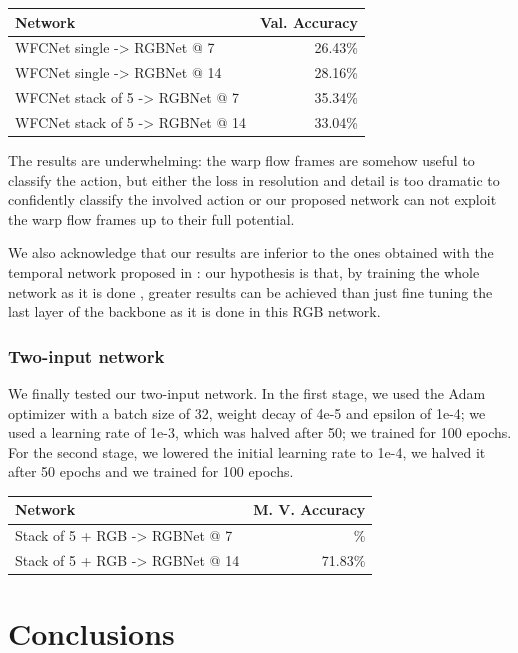 \documentclass[10pt,twocolumn,letterpaper]{article}
\begin{document}
\vspace{12pt} \noindent
\begin{tabular}{l|r}
	Network & Val. Accuracy \\
	\hline
	WFCNet single -> RGBNet @ 7 & 26.43\% \\
	WFCNet single -> RGBNet @ 14 & 28.16\% \\
	\hline
	WFCNet stack of 5 -> RGBNet @ 7 & 35.34\% \\
	WFCNet stack of 5 -> RGBNet @ 14 & 33.04\% \\
\end{tabular} \vspace{6pt}

The results are underwhelming: the warp flow frames are somehow useful to classify the action, but either the loss in resolution and detail is too dramatic to confidently classify the involved action or our proposed network can not exploit the warp flow frames up to their full potential.

We also acknowledge that our results are inferior to the ones obtained with the temporal network proposed in \cite{Ego-RNN}: our hypothesis is that, by training the whole network as it is done \cite{Ego-RNN}, greater results can be achieved than just fine tuning the last layer of the backbone as it is done in this RGB network.

\subsubsection{Two-input network}

We finally tested our two-input network. In the first stage, we used the Adam optimizer with a batch size of 32, weight decay of 4e-5 and epsilon of 1e-4; we used a learning rate of 1e-3, which was halved after 50; we trained for 100 epochs. For the second stage, we lowered the initial learning rate to 1e-4, we halved it after 50 epochs and we trained for 100 epochs.

\vspace{12pt} \noindent
\begin{tabular}{l|r}
	Network & M. V. Accuracy \\
	\hline
	Stack of 5 + RGB -> RGBNet @ 7 & \% \\
    Stack of 5 + RGB -> RGBNet @ 14 & 71.83\% \\
\end{tabular}

\section{Conclusions}
\end{document}
